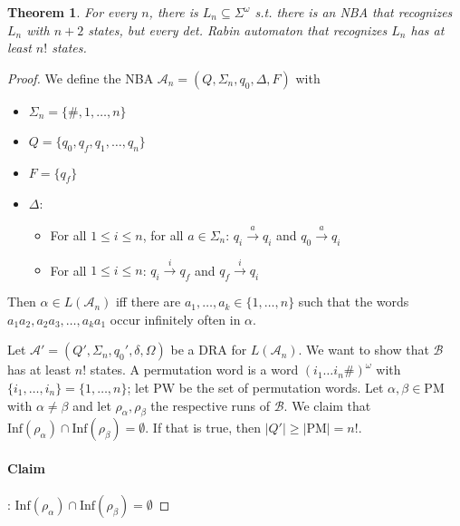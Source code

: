\documentclass{article}
\newtheorem{theorem}{Theorem}[section]
\begin{document}
\vspace{.5cm}
\begin{theorem}
	For every $n$, there is $L_n \subseteq \Sigma^\omega$ s.t. there is an NBA that recognizes $L_n$ with $n+2$ states, but every det. Rabin automaton that recognizes $L_n$ has at least $n!$ states.
\end{theorem}
\begin{proof}
	We define the NBA $\mathcal{A}_n = (Q, \Sigma_n, q_0, \Delta, F)$ with
	\begin{itemize}
		\item $\Sigma_n = \{\#, 1, \dots, n\}$
		\item $Q = \{q_0, q_f, q_1, \dots, q_n\}$
		\item $F = \{q_f\}$
		\item $\Delta$:
		\begin{itemize}
			\item For all $1 \leq i \leq n$, for all $a \in \Sigma_n$: $q_i \overset{a}{\rightarrow} q_i$ and $q_0 \overset{a}{\rightarrow} q_i$
			\item For all $1 \leq i \leq n$: $q_i \overset{i}{\rightarrow} q_f$ and $q_f \overset{i}{\rightarrow} q_i$
		\end{itemize}
	\end{itemize} %
	
	Then $\alpha \in L(\mathcal{A}_n)$ iff there are $a_1, \dots, a_k \in \{1, \dots, n\}$ such that the words $a_1 a_2, a_2 a_3, \dots, a_k a_1$ occur infinitely often in $\alpha$.
	
	Let $\mathcal{A}' = (Q', \Sigma_n, q_0', \delta, \Omega)$ be a DRA for $L(\mathcal{A}_n)$. We want to show that $\mathcal{B}$ has at least $n!$ states. A permutation word is a word $(i_1 \dots i_n \#)^\omega$ with $\{i_1, \dots, i_n\} = \{1, \dots, n\}$; let $\text{PW}$ be the set of permutation words. Let $\alpha, \beta \in \text{PM}$ with $\alpha \neq \beta$ and let $\rho_\alpha, \rho_\beta$ the respective runs of $\mathcal{B}$. We claim that $\text{Inf}(\rho_\alpha) \cap \text{Inf}(\rho_\beta) = \emptyset$. If that is true, then $|Q'| \geq |\text{PM}| = n!$.
	
	\paragraph{Claim}: $\text{Inf}(\rho_\alpha) \cap \text{Inf}(\rho_\beta) = \emptyset$
	

\end{proof}
\end{document}
